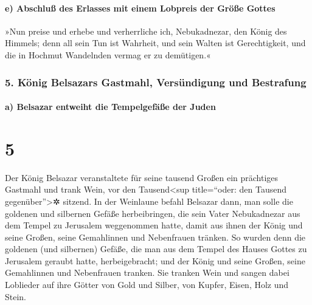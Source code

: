 \hypertarget{e-abschluuxdf-des-erlasses-mit-einem-lobpreis-der-gruxf6uxdfe-gottes}{%
\paragraph{e) Abschluß des Erlasses mit einem Lobpreis der Größe
Gottes}\label{e-abschluuxdf-des-erlasses-mit-einem-lobpreis-der-gruxf6uxdfe-gottes}}

»Nun preise und erhebe und verherrliche ich,
Nebukadnezar, den König des Himmels; denn all sein Tun ist Wahrheit, und
sein Walten ist Gerechtigkeit, und die in Hochmut Wandelnden vermag er
zu demütigen.«

\hypertarget{kuxf6nig-belsazars-gastmahl-versuxfcndigung-und-bestrafung}{%
\subsubsection{5. König Belsazars Gastmahl, Versündigung und
Bestrafung}\label{kuxf6nig-belsazars-gastmahl-versuxfcndigung-und-bestrafung}}

\hypertarget{a-belsazar-entweiht-die-tempelgefuxe4uxdfe-der-juden}{%
\paragraph{a) Belsazar entweiht die Tempelgefäße der
Juden}\label{a-belsazar-entweiht-die-tempelgefuxe4uxdfe-der-juden}}

\hypertarget{section-4}{%
\section{5}\label{section-4}}

Der König Belsazar veranstaltete für seine tausend Großen
ein prächtiges Gastmahl und trank Wein, vor den Tausend\textless sup
title=``oder: den Tausend gegenüber''\textgreater✲ sitzend.
In der Weinlaune befahl Belsazar dann, man solle die
goldenen und silbernen Gefäße herbeibringen, die sein Vater Nebukadnezar
aus dem Tempel zu Jerusalem weggenommen hatte, damit aus ihnen der König
und seine Großen, seine Gemahlinnen und Nebenfrauen tränken.
So wurden denn die goldenen (und silbernen) Gefäße, die
man aus dem Tempel des Hauses Gottes zu Jerusalem geraubt hatte,
herbeigebracht; und der König und seine Großen, seine Gemahlinnen und
Nebenfrauen tranken. Sie tranken Wein und sangen dabei
Loblieder auf ihre Götter von Gold und Silber, von Kupfer, Eisen, Holz
und Stein.

